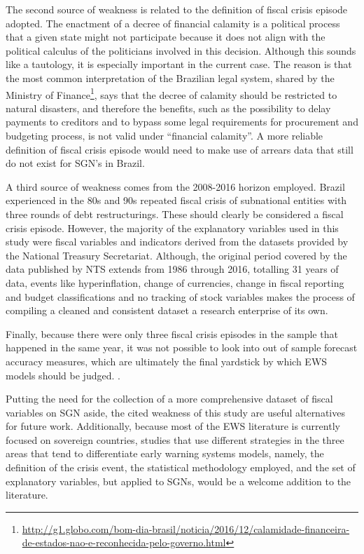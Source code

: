 The second source of weakness is related to the definition of fiscal crisis episode adopted. The enactment of a decree of financial calamity is a political process that a given state might not participate because it does not align with the political calculus of the politicians involved in this decision. Although this sounds like a tautology, it is especially important in the current case. The reason is that the most common interpretation of the Brazilian legal system, shared by the Ministry of Finance\footnote{\url{http://g1.globo.com/bom-dia-brasil/noticia/2016/12/calamidade-financeira-de-estados-nao-e-reconhecida-pelo-governo.html}}, says that the decree of calamity should be restricted to natural disasters, and therefore the benefits, such as the possibility to delay payments to creditors and to bypass some legal requirements for procurement and budgeting process, is not valid under ``financial calamity''. A more reliable definition of fiscal crisis episode would need to make use of arrears data that still do not exist for SGN's in Brazil.

A third source of weakness comes from the 2008-2016 horizon employed. Brazil experienced in the 80s and 90s repeated fiscal crisis of subnational entities with three rounds of debt restructurings. These should clearly be considered a fiscal crisis episode. However, the majority of the explanatory variables used in this study were fiscal variables and indicators derived from the datasets provided by the National Treasury Secretariat. Although, the original period covered by the data published by NTS extends from 1986 through 2016, totalling 31 years of data, events like hyperinflation, change of currencies, change in fiscal reporting and budget classifications and no tracking of stock variables makes the process of compiling a cleaned and consistent dataset a research enterprise of its own.

Finally, because there were only three fiscal crisis episodes in the sample that happened in the same year, it was not possible to look into out of sample forecast accuracy measures, which are ultimately the final yardstick by which EWS models should be judged. \citep{berg2005}.

Putting the need for the collection of a more comprehensive dataset of fiscal variables on SGN aside, the cited weakness of this study are useful alternatives for future work. Additionally, because most of the EWS literature is currently focused on sovereign countries, studies that use different strategies in the three areas that tend to differentiate early warning systems models, namely, the definition of the crisis event, the statistical methodology employed, and the set of explanatory variables, but applied to SGNs, would be a welcome addition to the literature.

